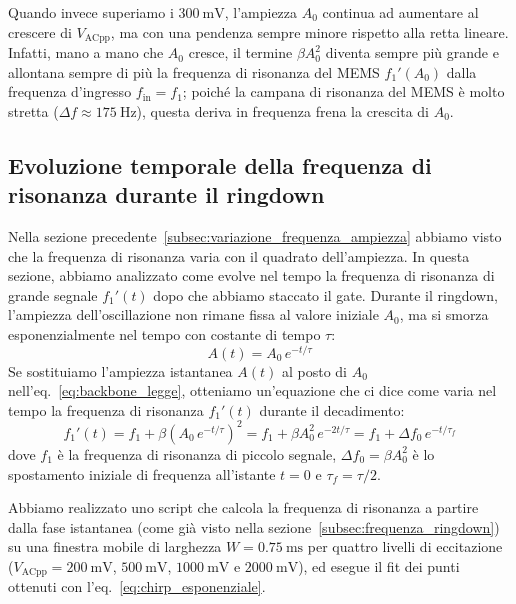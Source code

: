\documentclass[11pt,a4paper]{article}
\begin{document}
\vspace{0.3cm}
\noindent Quando invece superiamo i $\SI{300}{\milli\volt}$, l'ampiezza $A_0$ continua ad aumentare al crescere di $V_{\text{ACpp}}$, ma con una pendenza sempre minore rispetto alla retta lineare. Infatti, mano a mano che $A_0$ cresce, il termine $\beta A_0^2$ diventa sempre più grande e allontana sempre di più la frequenza di risonanza del MEMS $f_1'(A_0)$ dalla frequenza d'ingresso $f_{\text{in}} = f_1$; poiché la campana di risonanza del MEMS è molto stretta ($\Delta f \approx \SI{175}{\hertz}$), questa deriva in frequenza frena la crescita di $A_0$.

\subsection{Evoluzione temporale della frequenza di risonanza durante il ringdown}
\label{subsec:chirp_frequenza_ringdown}

Nella sezione precedente~\ref{subsec:variazione_frequenza_ampiezza} abbiamo visto che la frequenza di risonanza varia con il quadrato dell'ampiezza. In questa sezione, abbiamo analizzato come evolve nel tempo la frequenza di risonanza di grande segnale $f_1'(t)$ dopo che abbiamo staccato il gate. Durante il ringdown, l'ampiezza dell'oscillazione non rimane fissa al valore iniziale $A_0$, ma si smorza esponenzialmente nel tempo con costante di tempo $\tau$:
\begin{equation}
    A(t) = A_0 \, e^{-t/\tau}
\end{equation}
Se sostituiamo l'ampiezza istantanea $A(t)$ al posto di $A_0$ nell'eq.~\eqref{eq:backbone_legge}, otteniamo un'equazione che ci dice come varia nel tempo la frequenza di risonanza $f_1'(t)$ durante il decadimento:
\begin{equation}
    \label{eq:chirp_esponenziale}
    f_1'(t) = f_1 + \beta \left( A_0 \, e^{-t/\tau} \right)^2 = f_1 + \beta A_0^2 \, e^{-2t/\tau} = f_1 + \Delta f_0 \, e^{-t/\tau_f}
\end{equation}
dove $f_1$ è la frequenza di risonanza di piccolo segnale, $\Delta f_0 = \beta A_0^2$ è lo spostamento iniziale di frequenza all'istante $t = 0$ e $\tau_f = \tau / 2$. 

\vspace{0.3cm}
\noindent Abbiamo realizzato uno script che calcola la frequenza di risonanza a partire dalla fase istantanea (come già visto nella sezione~\ref{subsec:frequenza_ringdown}) su una finestra mobile di larghezza $W = \SI{0.75}{\milli\second}$ per quattro livelli di eccitazione ($V_{\text{ACpp}} = \SI{200}{\milli\volt}$, $\SI{500}{\milli\volt}$, $\SI{1000}{\milli\volt}$ e $\SI{2000}{\milli\volt}$), ed esegue il fit dei punti ottenuti con l'eq.~\eqref{eq:chirp_esponenziale}.
\end{document}
